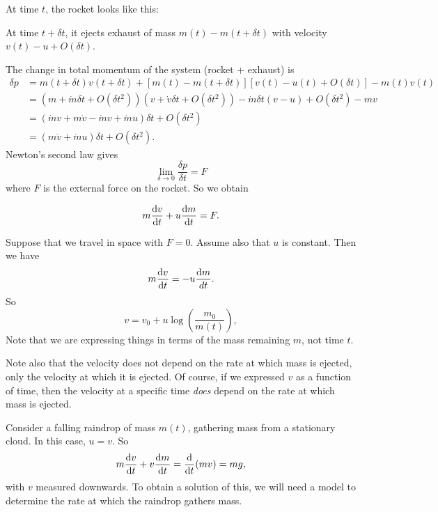 At time $t$, the rocket looks like this:
\begin{center}
\end{center}
At time $t + \delta t$, it ejects exhaust of mass $m(t) - m(t + \delta t)$ with velocity $v(t) - u + O(\delta t)$.
\begin{center}
\end{center}
The change in total momentum of the system (rocket + exhaust) is
\begin{align*}
  \delta p &= m(t + \delta t)v(t + \delta t) + [m(t) - m(t + \delta t)][v(t) - u(t) + O(\delta t)] - m(t)v(t)\\
  &= (m + \dot{m}\delta t + O(\delta t^2))(v + \dot{v} \delta t + O(\delta t^2)) - \dot{m}\delta t(v - u) + O(\delta t^2) - mv\\
  &= (\dot{m}v + m\dot{v} - \dot{m}v + \dot{m}u)\delta t + O(\delta t^2)\\
  &= (m\dot{v} + \dot{m}u)\delta t + O(\delta t^2).
\end{align*}
Newton's second law gives
\[
  \lim_{\delta \to 0} \frac{\delta p}{\delta t} = F
\]
where $F$ is the external force on the rocket. So we obtain
\begin{proposition}
  \[
    m\frac{\mathrm{d} v}{\mathrm{d} t} + u\frac{\mathrm{d} m}{\mathrm{d} t} = F.
  \]
\end{proposition}
\begin{example}
  Suppose that we travel in space with $F = 0$. Assume also that $u$ is constant. Then we have
  \[
    m\frac{\mathrm{d} v}{\mathrm{d} t} = -u\frac{\mathrm{d} m}{d t}.
  \]
  So
  \[
    v = v_0 + u \log \left(\frac{m_0}{m(t)}\right),
  \]
  Note that we are expressing things in terms of the mass remaining $m$, not time $t$.

  Note also that the velocity does not depend on the rate at which mass is ejected, only the velocity at which it is ejected. Of course, if we expressed $v$ as a function of time, then the velocity at a specific time \emph{does} depend on the rate at which mass is ejected.
\end{example}

\begin{example}
  Consider a falling raindrop of mass $m(t)$, gathering mass from a stationary cloud. In this case, $u = v$. So
  \[
    m\frac{\mathrm{d} v}{\mathrm{d} t} + v\frac{\mathrm{d} m}{\mathrm{d} t} = \frac{\mathrm{d} }{\mathrm{d} t}(mv) = mg,
  \]
  with $v$ measured downwards. To obtain a solution of this, we will need a model to determine the rate at which the raindrop gathers mass.
\end{example}